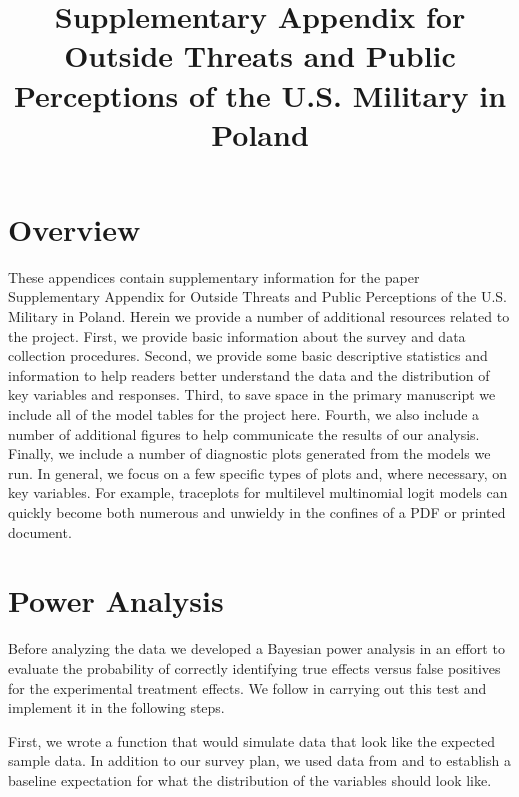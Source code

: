 \documentclass[
  10,
  letterpaper,
  DIV=11,
  numbers=noendperiod]{scrartcl}
\title{Supplementary Appendix for Outside Threats and Public Perceptions
of the U.S. Military in Poland}
\author{}
\date{}
\renewcommand*\contentsname{Table of contents}
\newcommand\contentsname{Table of contents}
\begin{document}
\maketitle
\ifdefined\Shaded\renewenvironment{Shaded}{\begin{tcolorbox}[frame hidden, boxrule=0pt, borderline west={3pt}{0pt}{shadecolor}, sharp corners, breakable, interior hidden, enhanced]}{\end{tcolorbox}}\fi

\renewcommand*\contentsname{Table of contents}
{
\hypersetup{linkcolor=}
\setcounter{tocdepth}{3}
\tableofcontents
}
\hypertarget{overview}{%
\section{Overview}\label{overview}}

These appendices contain supplementary information for the paper
Supplementary Appendix for Outside Threats and Public Perceptions of the
U.S. Military in Poland. Herein we provide a number of additional
resources related to the project. First, we provide basic information
about the survey and data collection procedures. Second, we provide some
basic descriptive statistics and information to help readers better
understand the data and the distribution of key variables and responses.
Third, to save space in the primary manuscript we include all of the
model tables for the project here. Fourth, we also include a number of
additional figures to help communicate the results of our analysis.
Finally, we include a number of diagnostic plots generated from the
models we run. In general, we focus on a few specific types of plots
and, where necessary, on key variables. For example, traceplots for
multilevel multinomial logit models can quickly become both numerous and
unwieldy in the confines of a PDF or printed document.

\hypertarget{power-analysis}{%
\section{Power Analysis}\label{power-analysis}}

Before analyzing the data we developed a Bayesian power analysis in an
effort to evaluate the probability of correctly identifying true effects
versus false positives for the experimental treatment effects. We follow
\citet{kruschkeDoingBayesianData2015} in carrying out this test and
implement it in the following steps.

First, we wrote a function that would simulate data that look like the
expected sample data. In addition to our survey plan, we used data from
\citet{Allenetal2020} and \citet{Allenetal2022} to establish a baseline
expectation for what the distribution of the variables should look like.
\end{document}
